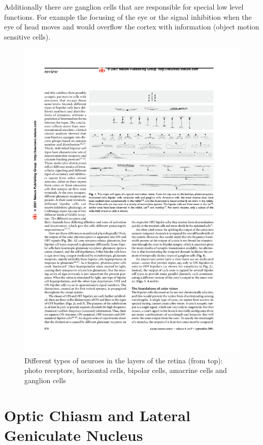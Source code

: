 		Additionally there are ganglion cells that are responsible for special low level functions. For example the focusing of the eye or the signal inhibition when the eye of head moves and would overflow the cortex with information (object motion sensitive cells).
		
		\begin{figure}[H]
			\centering
			\captionsetup{justification=centering,margin=0.5cm}
			\includegraphics[width=\textwidth, trim=6.2cm 15.7cm 2cm 4cm, clip]{images/masland-2001-neuron-types.pdf}
			\caption{Different types of neuroes in the layers of the retina (from top): photo receptors, horizontal cells, bipolar cells, amacrine cells and ganglion cells \citep{masland2001fundamental}}
		\end{figure}
		
	\section{Optic Chiasm and Lateral Geniculate Nucleus}
	
